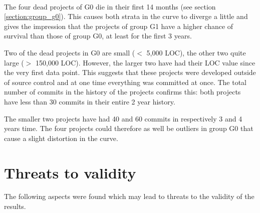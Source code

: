 \paragraph{}
The four dead projects of G0 die in their first 14 months (see section
\ref{section:group_g0}). This causes both strata in the curve to diverge a
little and gives the impression that the projects of group G1 have a higher
chance of survival than those of group G0, at least for the first 3 years.

Two of the dead projects in G0 are small ($<$ 5,000 LOC), the other two
quite large ($>$ 150,000 LOC). However, the larger two have had their LOC value
since the very first data point. This suggests that these projects were
developed outside of source control and at one time everything was committed at
once. The total number of commits in the history of the projects confirms this:
both projects have less than 30 commits in their entire 2 year history.

The smaller two projects have had 40 and 60 commits in respectively 3 and 4
years time. The four projects could therefore as well be outliers in group G0
that cause a slight distortion in the curve.


\section{Threats to validity}
The following aspects were found which may lead to threats to the validity of
the results.

